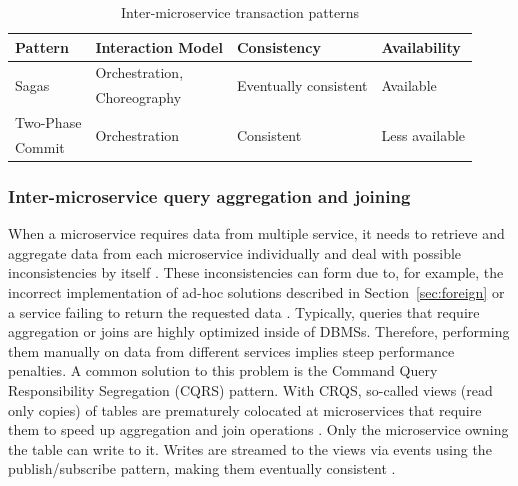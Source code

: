 \begin{table}
    \begin{tabular}{p{1.5cm}p{2cm}p{2cm}l}
        \toprule
        \textbf{Pattern}       & \textbf{Interaction Model}       & \textbf{Consistency}                     & \textbf{Availability}              \\
        \midrule
        \multirow{2}{*}{Sagas} & Orchestration,                   & \multirow{2}{2cm}{Eventually consistent} & \multirow{2}{*}{Available}         \\
                               & Choreography                     &                                          &                                    \\
        \hline
        Two-Phase              & \multirow{2}{2cm}{Orchestration} & \multirow{2}{2cm}{Consistent}            & \multirow{2}{2cm}{Less available } \\
        Commit                 &                                  &                                          &                                    \\
        \bottomrule
    \end{tabular}
    \caption{Inter-microservice transaction patterns}
    \label{table:transactions}
\end{table}

\subsubsection{Inter-microservice query aggregation and joining}
When a microservice requires data from multiple service, it needs to retrieve and aggregate data from each microservice individually and deal with possible inconsistencies by itself \cite{Laigner20213348}. These inconsistencies can form due to, for example, the incorrect implementation of ad-hoc solutions described in Section~\ref{sec:foreign} or a service failing to return the requested data \cite{richardson2018microservices}. Typically, queries that require aggregation or joins are highly optimized inside of DBMSs. Therefore, performing them manually on data from different services implies steep performance penalties. A common solution to this problem is the Command Query Responsibility Segregation (CQRS) pattern. With CRQS, so-called views (read only copies) of tables are prematurely colocated at microservices that require them to speed up aggregation and join operations \cite{richardson2018microservices}. Only the microservice owning the table can write to it. Writes are streamed to the views via events using the publish/subscribe pattern, making them eventually consistent \cite{richardson2018microservices}.
















